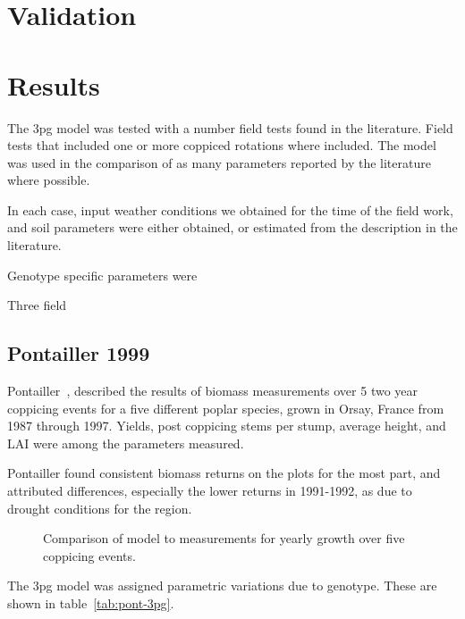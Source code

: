 \documentclass[10pt]{article}
\begin{document}
\section*{Validation}

\section*{Results}

The \ac{3pg} model was tested with a number field tests found in the
literature.  Field tests that included one or more coppiced rotations
where included.  The model was used in the comparison of as many
parameters reported by the literature where possible.  

In each case, input weather conditions we obtained for the time of the
field work, and soil parameters were either obtained, or estimated
from the description in the literature.  

Genotype specific parameters were

Three field
\subsection{Pontailler 1999}
\label{sec:pont}

Pontailler~\cite{Pontailler1999}, described the results of biomass
measurements over 5 two year coppicing events for a five different
poplar species, grown in Orsay, France from 1987 through 1997.
Yields, post coppicing stems per stump, average height, and \ac{LAI}
were among the parameters measured.

Pontailler found consistent biomass returns on the plots for the most
part, and attributed differences, especially the lower returns in
1991-1992, as due to drought conditions for the region.  


\begin{figure}[!ht]
  \centering
  
  \caption{Comparison of model to measurements for yearly growth over five
    coppicing events.}
\label{fig:pont-biomass}
\end{figure}



The \ac{3pg}
model was assigned parametric variations due to genotype.  These are
shown in table~\ref{tab:pont-3pg}.

\begin{table}[!ht]
  \centering
  \caption{\ac{3pg} parameter variations of \ac{3pg} among genotypes}
  \label{tab:pont-3pg}
\end{table}
\end{document}
